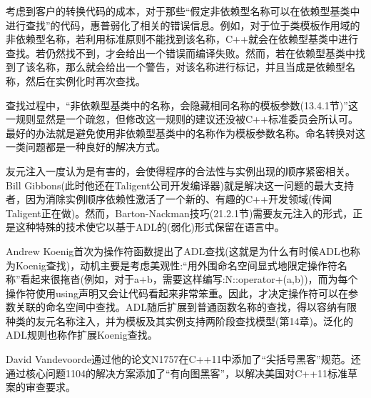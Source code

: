 考虑到客户的转换代码的成本，对于那些“假定非依赖型名称可以在依赖型基类中进行查找”的代码，惠普弱化了相关的错误信息。例如，对于位于类模板作用域的非依赖型名称，若利用标准原则不能找到该名称，C++就会在依赖型基类中进行查找。若仍然找不到，才会给出一个错误而编译失败。然而，若在依赖型基类中找到了该名称，那么就会给出一个警告，对该名称进行标记，并且当成是依赖型名称，然后在实例化时再次查找。

查找过程中，“非依赖型基类中的名称，会隐藏相同名称的模板参数(13.4.1节)”这一规则显然是一个疏忽，但修改这一规则的建议还没被C++标准委员会所认可。最好的办法就是避免使用非依赖型基类中的名称作为模板参数名称。命名转换对这一类问题都是一种良好的解决方式。

友元注入一度认为是有害的，会使得程序的合法性与实例出现的顺序紧密相关。Bill Gibbons(此时他还在Taligent公司开发编译器)就是解决这一问题的最大支持者，因为消除实例顺序依赖性激活了一个新的、有趣的C++开发领域(传闻Taligent正在做)。然而，Barton-Nackman技巧(21.2.1节)需要友元注入的形式，正是这种特殊的技术使它以基于ADL的(弱化)形式保留在语言中。

Andrew Koenig首次为操作符函数提出了ADL查找(这就是为什么有时候ADL也称为Koenig查找)，动机主要是考虑美观性:“用外围命名空间显式地限定操作符名称”看起来很拖沓(例如，对于a+b，需要这样编写:N::operator+(a,b))，而为每个操作符使用using声明又会让代码看起来非常笨重。因此，才决定操作符可以在参数关联的命名空间中查找。ADL随后扩展到普通函数名称的查找，得以容纳有限种类的友元名称注入，并为模板及其实例支持两阶段查找模型(第14章)。泛化的ADL规则也称作扩展Koenig查找。

David Vandevoorde通过他的论文N1757在C++11中添加了“尖括号黑客”规范。还通过核心问题1104的解决方案添加了“有向图黑客”，以解决美国对C++11标准草案的审查要求。
